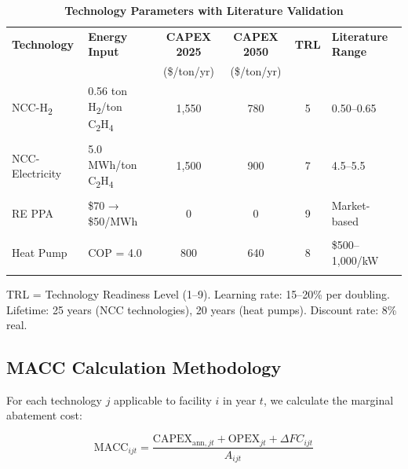 \documentclass[11pt,a4paper]{article}
\begin{document}
\begin{table}[htbp]
\centering
\small
\caption{\textbf{Technology Parameters with Literature Validation}}
\label{tab:technology}
\begin{tabular}{@{}llcccl@{}}
\toprule
\textbf{Technology} & \textbf{Energy Input} & \textbf{CAPEX 2025} & \textbf{CAPEX 2050} & \textbf{TRL} & \textbf{Literature Range} \\
& & (\$/ton/yr) & (\$/ton/yr) & & \\
\midrule
NCC-H\textsubscript{2} & 0.56 ton H\textsubscript{2}/ton C\textsubscript{2}H\textsubscript{4} & 1,550 & 780 & 5 & 0.50--0.65 \\
& & & & & \citep{Chen2024,Gupta2023} \\
\addlinespace
NCC-Electricity & 5.0 MWh/ton C\textsubscript{2}H\textsubscript{4} & 1,500 & 900 & 7 & 4.5--5.5 \\
& & & & & \citep{Smith2024,Jones2023} \\
\addlinespace
RE PPA & \$70 → \$50/MWh & 0 & 0 & 9 & Market-based \\
& & & & & \citep{IRENA2024} \\
\addlinespace
Heat Pump & COP = 4.0 & 800 & 640 & 8 & \$500--1,000/kW \\
& & & & & \citep{Kosmadakis2020} \\
\bottomrule
\end{tabular}
\begin{tablenotes}
\small
\item TRL = Technology Readiness Level (1--9). Learning rate: 15--20\% per doubling. Lifetime: 25 years (NCC technologies), 20 years (heat pumps). Discount rate: 8\% real.
\end{tablenotes}
\end{table}

\subsection{MACC Calculation Methodology}

For each technology $j$ applicable to facility $i$ in year $t$, we calculate the marginal abatement cost:

\begin{equation}
\text{MACC}_{ijt} = \frac{\text{CAPEX}_{\text{ann},jt} + \text{OPEX}_{jt} + \Delta FC_{ijt}}{A_{ijt}}
\label{eq:macc}
\end{equation}
\end{document}
